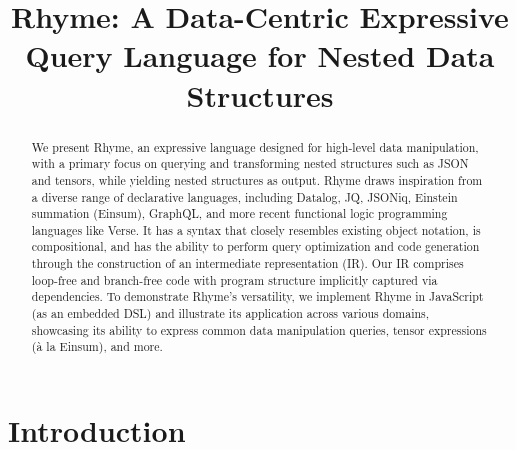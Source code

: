 \documentclass[runningheads]{llncs}
\newcommand{\lang}{Rhyme}
\begin{document}
%
\title{\lang{}: A Data-Centric Expressive Query Language for Nested Data Structures}

\author{}
\institute{}
%
%
%
\maketitle              %
\vspace{-15mm} %
%
\begin{abstract}
We present \lang{},
an expressive language
designed for high-level data manipulation, with a primary focus on querying
and transforming nested structures such as JSON and tensors,
while yielding nested structures as output.
\lang{} draws inspiration from a diverse range of declarative languages,
including Datalog, JQ, JSONiq, Einstein summation (Einsum), GraphQL, and more
recent functional logic programming languages like Verse.
It has a syntax that closely resembles existing object notation,
is compositional, and has the ability to perform query optimization and
code generation through the construction of an intermediate
representation (IR).
Our IR comprises loop-free and branch-free code with program structure
implicitly captured via dependencies.
To demonstrate \lang{}'s versatility, 
we implement \lang{} in JavaScript (as an embedded DSL) and 
illustrate its application
across various domains, showcasing its ability to express common
data manipulation queries, tensor expressions (à la Einsum), and more.
\end{abstract}
%
%
%
\vspace{-10mm}
\section{Introduction}\label{sec:intro}
\vspace{-3mm}
\end{document}

